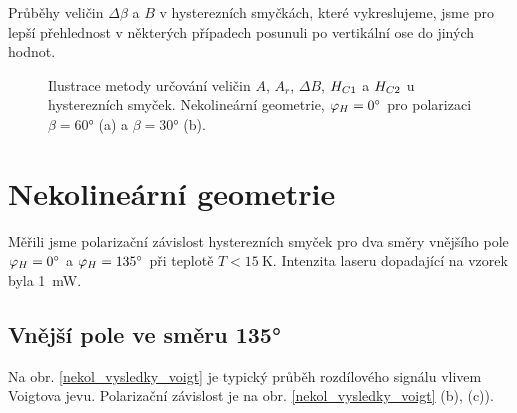 Průběhy veličin $\Delta \beta$ a $B$ v hysterezních smyčkách, které vykreslujeme, jsme pro lepší přehlednost v některých případech posunuli po vertikální ose do jiných hodnot.

\begin{figure}[htbp]\centering
{}
	\caption{Ilustrace metody určování veličin $A$, $A_r$, $\Delta B$, $H_{C1}$ a $H_{C2}$ u hysterezních smyček. Nekolineární geometrie, $\varphi_H=\ang{0}$ pro polarizaci $\beta=\ang{60}$ (a) a $\beta=\ang{30}$ (b).}\label{zpracovani}
\end{figure}

\FloatBarrier


\section{Nekolineární geometrie}
Měřili jsme polarizační závislost hysterezních smyček pro dva směry vnějšího pole $\varphi_H=\ang{0}$ a $\varphi_H=\ang{135}$ při teplotě $T<\SI{15}{\kelvin}$. Intenzita laseru dopadající na vzorek byla \SI{1}{\milli\watt}.

\subsection*{Vnější pole ve směru \ang{135}}
Na obr. \ref{nekol_vysledky_voigt} je typický průběh rozdílového signálu vlivem Voigtova jevu. Polarizační závislost je na obr. \ref{nekol_vysledky_voigt} (b), (c)).


